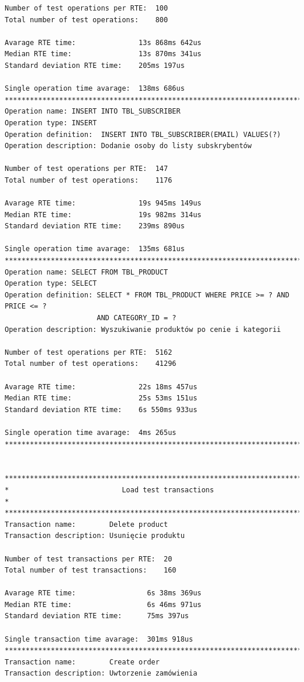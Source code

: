 \begin{Verbatim}
Number of test operations per RTE:  100
Total number of test operations:    800

Avarage RTE time:               13s 868ms 642us
Median RTE time:                13s 870ms 341us
Standard deviation RTE time:    205ms 197us

Single operation time avarage:  138ms 686us
*********************************************************************************
Operation name: INSERT INTO TBL_SUBSCRIBER
Operation type: INSERT
Operation definition:  INSERT INTO TBL_SUBSCRIBER(EMAIL) VALUES(?)
Operation description: Dodanie osoby do listy subskrybentów

Number of test operations per RTE:  147
Total number of test operations:    1176

Avarage RTE time:               19s 945ms 149us
Median RTE time:                19s 982ms 314us
Standard deviation RTE time:    239ms 890us

Single operation time avarage:  135ms 681us
*********************************************************************************
Operation name: SELECT FROM TBL_PRODUCT
Operation type: SELECT
Operation definition: SELECT * FROM TBL_PRODUCT WHERE PRICE >= ? AND PRICE <= ? 
                      AND CATEGORY_ID = ?
Operation description: Wyszukiwanie produktów po cenie i kategorii

Number of test operations per RTE:  5162
Total number of test operations:    41296

Avarage RTE time:               22s 18ms 457us
Median RTE time:                25s 53ms 151us
Standard deviation RTE time:    6s 550ms 933us

Single operation time avarage:  4ms 265us
*********************************************************************************


*********************************************************************************
*                           Load test transactions                              *
*********************************************************************************
Transaction name:        Delete product
Transaction description: Usunięcie produktu

Number of test transactions per RTE:  20
Total number of test transactions:    160

Avarage RTE time:                 6s 38ms 369us
Median RTE time:                  6s 46ms 971us
Standard deviation RTE time:      75ms 397us

Single transaction time avarage:  301ms 918us
*********************************************************************************
Transaction name:        Create order
Transaction description: Uwtorzenie zamówienia


\end{Verbatim}
